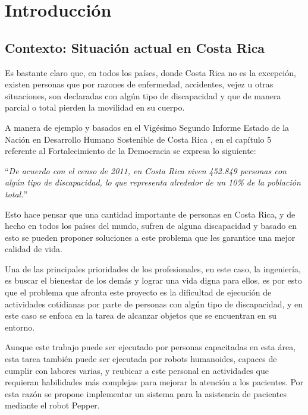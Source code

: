 
\chapter{Introducción}
\label{chp:intro}

\section{Contexto: Situación actual en Costa Rica}
Es bastante claro que, en todos los países, donde Costa Rica no es la excepción, existen personas que por razones de 
enfermedad, accidentes, vejez u otras situaciones, son declaradas con algún tipo de discapacidad y que de
manera parcial o total pierden la movilidad en su cuerpo. 

A manera de ejemplo y basados en el Vigésimo Segundo Informe Estado de la Nación en Desarrollo Humano Sostenible de 
Costa Rica \cite{estadonacion1}, en el capítulo 5 referente al Fortalecimiento de la Democracia se expresa lo siguiente: 

\begin{center}
“\textit{De acuerdo con el censo de 2011, en Costa Rica viven 452.849 personas con algún tipo de discapacidad, lo que
representa alrededor de un 10\% de la población total.}”

\end{center}
Esto hace pensar que una cantidad importante de personas en Costa Rica, y de hecho en todos los países del mundo, 
sufren de alguna discapacidad y basado en esto se pueden proponer soluciones a este problema que les garantice 
una mejor calidad de vida. 



Una de las principales prioridades de los profesionales, en este caso, la ingeniería, es buscar el bienestar de los
demás y lograr una vida digna para ellos, es por esto que el problema que afronta este proyecto es la dificultad de
ejecución de actividades cotidianas por parte de personas con algún tipo de discapacidad, y en este caso se enfoca
en la tarea de alcanzar objetos que se encuentran en su entorno. 

Aunque este trabajo puede ser ejecutado por personas capacitadas en esta área, esta tarea también puede ser ejecutada
por robots humanoides, capaces de cumplir con labores varias, y reubicar a este personal en actividades que requieran
habilidades más complejas para mejorar la atención a los pacientes. Por esta razón se propone implementar un sistema 
para la asistencia de pacientes mediante el robot Pepper.



